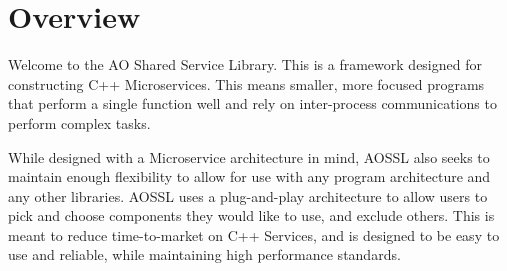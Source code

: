 \hypertarget{index_over}{}\section{Overview}\label{index_over}
Welcome to the AO Shared Service Library. This is a framework designed for constructing C++ Microservices. This means smaller, more focused programs that perform a single function well and rely on inter-\/process communications to perform complex tasks.

While designed with a Microservice architecture in mind, A\+O\+S\+SL also seeks to maintain enough flexibility to allow for use with any program architecture and any other libraries. A\+O\+S\+SL uses a plug-\/and-\/play architecture to allow users to pick and choose components they would like to use, and exclude others. This is meant to reduce time-\/to-\/market on C++ Services, and is designed to be easy to use and reliable, while maintaining high performance standards. 